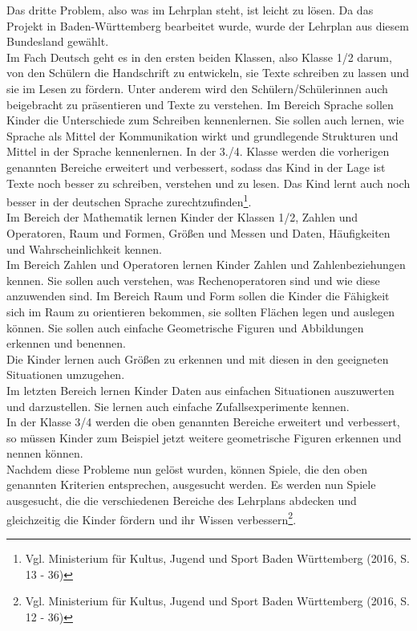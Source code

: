 Das dritte Problem, also was im Lehrplan steht, ist leicht zu lösen. Da das Projekt in Baden-Württemberg bearbeitet wurde, wurde der Lehrplan aus diesem Bundesland gewählt.\\
Im Fach Deutsch geht es in den ersten beiden Klassen, also Klasse 1/2 darum, von den Schülern die Handschrift zu entwickeln, sie Texte schreiben zu lassen und sie im Lesen zu fördern. Unter anderem wird den Schülern/Schülerinnen auch beigebracht zu präsentieren und Texte zu verstehen. Im Bereich Sprache sollen Kinder die Unterschiede zum Schreiben kennenlernen. Sie sollen auch lernen, wie Sprache als Mittel der Kommunikation wirkt und grundlegende Strukturen und Mittel in der Sprache kennenlernen. In der 3./4. Klasse werden die vorherigen genannten Bereiche erweitert und verbessert, sodass das Kind in der Lage ist Texte noch besser zu schreiben, verstehen und zu lesen. Das Kind lernt auch noch besser in der deutschen Sprache zurechtzufinden\footnote{Vgl. Ministerium für Kultus, Jugend und Sport Baden Württemberg (2016, S. 13 - 36)}.\\
Im Bereich der Mathematik lernen Kinder der Klassen 1/2, Zahlen und Operatoren, Raum und Formen, Größen und Messen und Daten, Häufigkeiten und Wahrscheinlichkeit kennen.\\
Im Bereich Zahlen und Operatoren lernen Kinder Zahlen und Zahlenbeziehungen kennen. Sie sollen auch verstehen, was Rechenoperatoren sind und wie diese anzuwenden sind. Im Bereich Raum und Form sollen die Kinder die Fähigkeit sich im Raum zu orientieren bekommen, sie sollten Flächen legen und auslegen können. Sie sollen auch einfache Geometrische Figuren und Abbildungen erkennen und benennen.\\
Die Kinder lernen auch Größen zu erkennen und mit diesen in den geeigneten Situationen umzugehen.\\
Im letzten Bereich lernen Kinder Daten aus einfachen Situationen auszuwerten und darzustellen. Sie lernen auch einfache Zufallsexperimente kennen. 
\\
In der Klasse 3/4 werden die oben genannten Bereiche erweitert und verbessert, so müssen Kinder zum Beispiel jetzt weitere geometrische Figuren erkennen und nennen können.
\\
Nachdem diese Probleme nun gelöst wurden, können Spiele, die den oben genannten Kriterien entsprechen, ausgesucht werden. Es werden nun Spiele ausgesucht, die die verschiedenen Bereiche des Lehrplans abdecken und gleichzeitig die Kinder fördern und ihr Wissen verbessern\footnote{Vgl. Ministerium für Kultus, Jugend und Sport Baden Württemberg (2016, S. 12 - 36)}.\\
